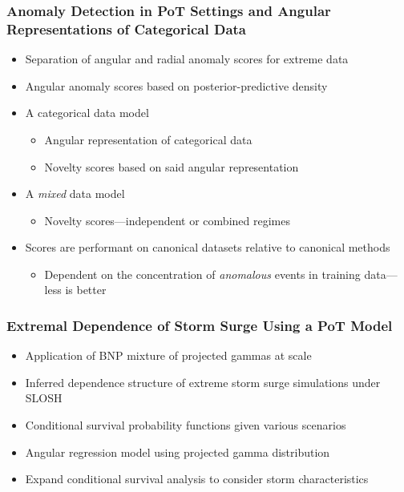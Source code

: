 \documentclass[aspectratio=169,10pt,notes]{beamer}
\begin{document}
\begin{frame}
    \frametitle{Anomaly Detection in PoT Settings and Angular Representations of Categorical Data}
    \begin{itemize}
        \item Separation of angular and radial anomaly scores for extreme data
        \item Angular anomaly scores based on posterior-predictive density
        \item A categorical data model
        \begin{itemize}
            \item Angular representation of categorical data
            \item Novelty scores based on said angular representation
        \end{itemize}
        \item A \emph{mixed} data model
        \begin{itemize}
            \item Novelty scores---independent or combined regimes
        \end{itemize}
        \item Scores are performant on canonical datasets relative to canonical methods
        \begin{itemize}
            \item Dependent on the concentration of \emph{anomalous} events in training data---less is better
        \end{itemize}
    \end{itemize}
\end{frame}

\begin{frame}
    \frametitle{Extremal Dependence of Storm Surge Using a PoT Model}
    \begin{itemize}
        \item Application of BNP mixture of projected gammas at scale
        \item Inferred dependence structure of extreme storm surge simulations under SLOSH
        \item Conditional survival probability functions given various scenarios
        \item Angular regression model using projected gamma distribution
        \item Expand conditional survival analysis to consider storm characteristics
    \end{itemize}
\end{frame}
\end{document}
